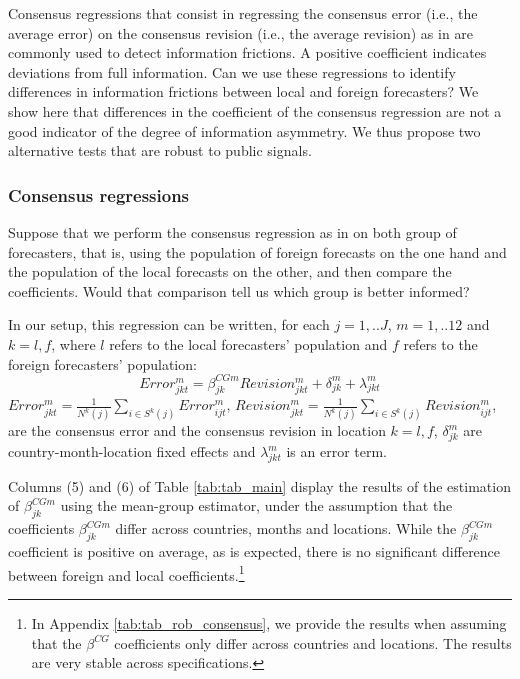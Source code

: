 
Consensus regressions that consist in regressing the consensus error (i.e., the average error) on the consensus revision (i.e., the average revision) as in \citet{CoibionGorodnichenko2015} are commonly used to detect information frictions. A positive coefficient indicates deviations from full information. Can we use these regressions to identify differences in information frictions between local and foreign forecasters?  We show here that differences in the coefficient of the consensus regression are not a good indicator of the degree of information asymmetry. We thus propose two alternative tests that are robust to public signals.

\subsubsection{Consensus regressions}


Suppose that we perform the consensus regression as in \citet{CoibionGorodnichenko2015} on both group of forecasters, that is, using the population of foreign forecasts on the one hand and the population of the local forecasts on the other, and then compare the coefficients. Would that comparison tell us which group is better informed?

In our setup, this regression can be written, for each $j=1,..J$, $m=1,..12$ and $k=l,f$, where $l$ refers to the local forecasters' population and $f$ refers to the foreign forecasters' population:
\begin{equation}Error_{jkt}^m=\beta^{CGm}_{jk}Revision_{jkt}^m+\delta_{jk}^m+\lambda_{jkt}^m\label{eq:consensus}
\end{equation}
$Error_{jkt}^m=\frac{1}{N^k(j)}\sum_{i\in\textit{S}^k(j)}Error_{ijt}^m$, $Revision_{jkt}^m=\frac{1}{N^k(j)}\sum_{i\in\textit{S}^k(j)}Revision_{ijt}^m$, are the consensus error and the consensus revision in location $k=l,f$, $\delta_{jk}^m$ are country-month-location fixed effects and $\lambda_{jkt}^m$ is an error term.

Columns (5) and (6) of Table \ref{tab:tab_main} display the results of the estimation of $\beta^{CGm}_{jk}$ using the mean-group estimator, under the assumption that the coefficients $\beta^{CGm}_{jk}$ differ across countries, months and locations. While the $\beta^{CGm}_{jk}$ coefficient is positive on average, as is expected, there is no significant difference between foreign and local coefficients.\footnote{In Appendix \ref{tab:tab_rob_consensus}, we provide the results when assuming that the $\beta^{CG}$ coefficients only differ across countries and locations. The results are very stable across specifications.}


